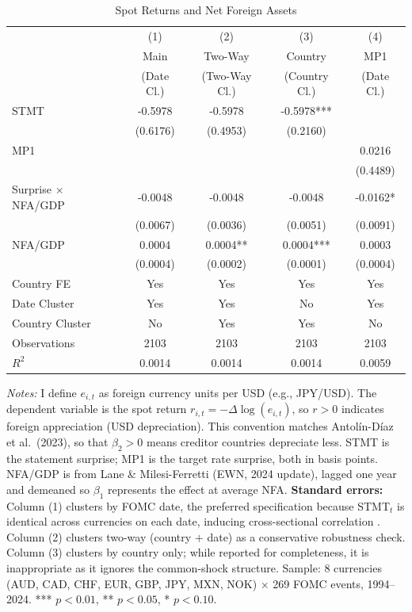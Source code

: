 \begin{table}[htbp]
\centering
\caption{Spot Returns and Net Foreign Assets}
\label{tab:nfa_panel}
\begin{tabular}{lcccc}
\hline\hline
 & (1) & (2) & (3) & (4) \\
 & Main & Two-Way & Country & MP1 \\
 & (Date Cl.) & (Two-Way Cl.) & (Country Cl.) & (Date Cl.) \\
\hline
STMT & -0.5978 & -0.5978 & -0.5978*** & \\
 & (0.6176) & (0.4953) & (0.2160) & \\
MP1 & & & & 0.0216 \\
 & & & & (0.4489) \\
Surprise $\times$ NFA/GDP & -0.0048 & -0.0048 & -0.0048 & -0.0162* \\
 & (0.0067) & (0.0036) & (0.0051) & (0.0091) \\
NFA/GDP & 0.0004 & 0.0004** & 0.0004*** & 0.0003 \\
 & (0.0004) & (0.0002) & (0.0001) & (0.0004) \\
\hline
Country FE & Yes & Yes & Yes & Yes \\
Date Cluster & Yes & Yes & No & Yes \\
Country Cluster & No & Yes & Yes & No \\
Observations & 2103 & 2103 & 2103 & 2103 \\
$R^2$ & 0.0014 & 0.0014 & 0.0014 & 0.0059 \\
\hline\hline
\end{tabular}
\begin{tablenotes}
\small
\item \textit{Notes:} I define $e_{i,t}$ as foreign currency units per USD
(e.g., JPY/USD). The dependent variable is the spot return
$r_{i,t} = -\Delta\log(e_{i,t})$, so $r > 0$ indicates foreign appreciation
(USD depreciation). This convention matches Antol\'{i}n-D\'{i}az et al.\ (2023),
so that $\beta_2 > 0$ means creditor countries depreciate less. STMT is the statement surprise;
MP1 is the target rate surprise, both in basis points. NFA/GDP is from Lane \&
Milesi-Ferretti (EWN, 2024 update), lagged one year and demeaned so $\beta_1$
represents the effect at average NFA.
\textbf{Standard errors:} Column (1) clusters by FOMC date, the preferred
specification because STMT$_t$ is identical across currencies on each date,
inducing cross-sectional correlation \citep{Petersen2009}. Column (2) clusters
two-way (country $+$ date) as a conservative robustness check. Column (3)
clusters by country only; while reported for completeness, it is inappropriate
as it ignores the common-shock structure.
Sample: 8 currencies (AUD, CAD, CHF, EUR, GBP, JPY, MXN, NOK)
$\times$ 269 FOMC events, 1994--2024.
*** $p<0.01$, ** $p<0.05$, * $p<0.10$.
\end{tablenotes}
\end{table}
